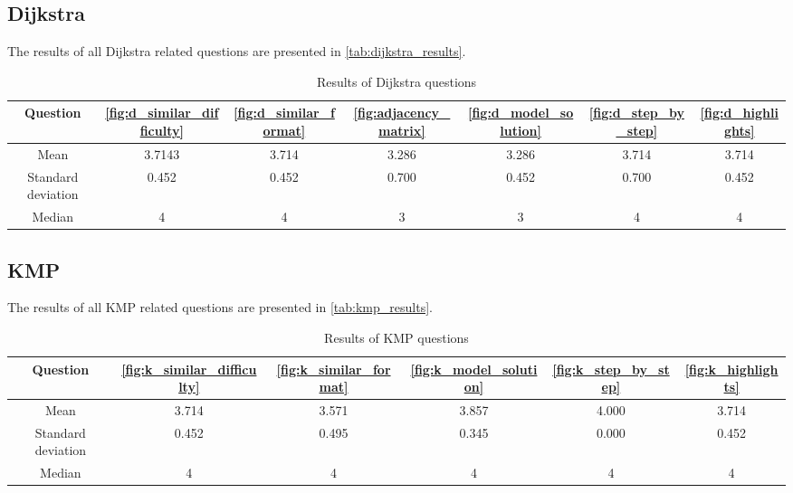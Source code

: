\documentclass{l4proj}
\begin{document}
\subsection{Dijkstra}
\label{sec:d_results}

The results of all Dijkstra related questions are presented in \autoref{tab:dijkstra_results}.

\begin{table}[h]
\begin{center}
\begin{tabular}{| c || c | c | c | c | c | c |}
	\hline
	Question & \autoref{fig:d_similar_difficulty} & \autoref{fig:d_similar_format} & \autoref{fig:adjacency_matrix} & \autoref{fig:d_model_solution} & \autoref{fig:d_step_by_step} & \autoref{fig:d_highlights} \\
	\hline
	\hline
	Mean & 3.7143 & 3.714 & 3.286 & 3.286 & 3.714 & 3.714 \\
	\hline
	Standard deviation & 0.452 & 0.452 & 0.700 & 0.452 & 0.700 & 0.452 \\
	\hline
	Median & 4 & 4 & 3 & 3 & 4 & 4 \\
	\hline
\end{tabular}
\caption{\label{tab:dijkstra_results} Results of Dijkstra questions}
\end{center}
\end{table}

\subsection{KMP}
\label{sec:k_results}

The results of all KMP related questions are presented in \autoref{tab:kmp_results}.

\begin{table}[h]
\begin{center}
\begin{tabular}{| c || c | c | c | c | c |}
	\hline
	Question & \autoref{fig:k_similar_difficulty} & \autoref{fig:k_similar_format} & \autoref{fig:k_model_solution} & \autoref{fig:k_step_by_step} & \autoref{fig:k_highlights} \\
	\hline
	\hline
	Mean & 3.714 & 3.571 & 3.857 & 4.000 & 3.714 \\
	\hline
	Standard deviation & 0.452 & 0.495 & 0.345 & 0.000 & 0.452 \\
	\hline
	Median & 4 & 4 & 4 & 4 & 4 \\
	\hline
\end{tabular}
\caption{\label{tab:kmp_results} Results of KMP questions}
\end{center}
\end{table}
\end{document}
